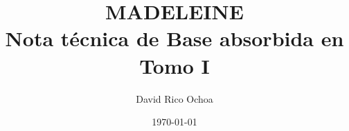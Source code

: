 \documentclass[11pt,oneside]{book}
\begin{document}
\frontmatter
\title{MADELEINE \\ Nota técnica de Base absorbida en Tomo I}
\author{David Rico Ochoa}
\date{\today}
\maketitle
\tableofcontents
\mainmatter


\end{document}
